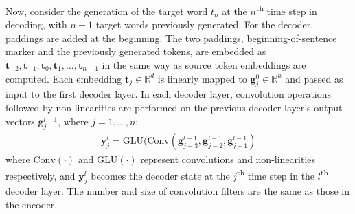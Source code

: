 \documentclass[letterpaper]{article} %
\begin{document}
Now, consider the generation of the target word $t_{n}$ at the $n$\textsuperscript{th} time step in decoding, with $n-1$ target words previously generated. For the decoder, paddings are added at the beginning. The two paddings, beginning-of-sentence marker and the previously generated tokens, are embedded as $\mathbf{t}_{-2},\mathbf{t}_{-1}, \mathbf{t}_0,\mathbf{t}_{1},\ldots,\mathbf{t}_{n-1}$ in the same way as source token embeddings are computed. Each embedding $\mathbf{t}_j \in \mathbb{R}^d$ is linearly mapped to $\mathbf{g}^0_{j} \in \mathbb{R}^h$ and passed as input to the first decoder layer. In each decoder layer, convolution operations followed by non-linearities are performed on the previous decoder layer's output vectors $\mathbf{g}^{l-1}_{j}$, where $j = 1,\ldots,n$:
\begin{align*}
\mathbf{y}^l_{j} = \text{GLU}(\text{Conv}(\mathbf{g}^{l-1}_{j-3},\mathbf{g}^{l-1}_{j-2},\mathbf{g}^{l-1}_{j-1})
\end{align*}
where $\text{Conv}(\cdot)$ and $\text{GLU}(\cdot)$ represent convolutions and non-linearities respectively, and $\mathbf{y}^l_j$ becomes the decoder state at the $j$\textsuperscript{th} time step in the $l$\textsuperscript{th} decoder layer. The number and size of convolution filters are the same as those in the encoder.
\end{document}

